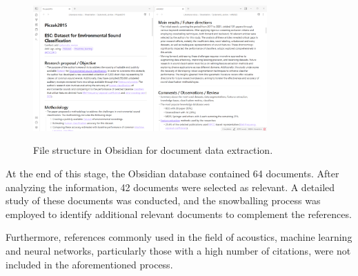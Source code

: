 \begin{figure}[htbp]
    \raggedright
        \caption{File structure in Obsidian for document data extraction.}
        \includegraphics[width=0.80\textwidth]{resources/images/080-systematic_review/Review_Obsidian_01_2023_11.png}
        \label{fig:systematic_review_methodology_obsidian}
\end{figure}

At the end of this stage, the Obsidian database contained 64 documents. After analyzing the information, 42 documents were selected as relevant. A detailed study of these documents was conducted, and the snowballing process was employed to identify additional relevant documents to complement the references.

Furthermore, references commonly used in the field of acoustics, machine learning and neural networks, particularly those with a high number of citations, were not included in the aforementioned process.